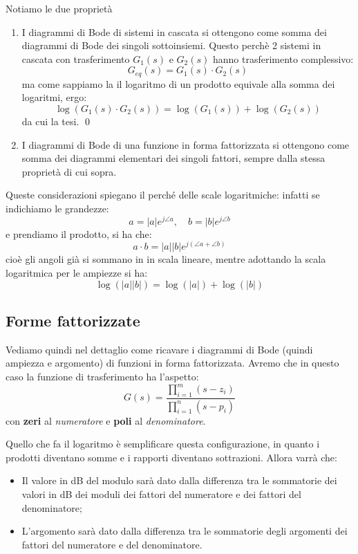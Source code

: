 \documentclass[a4paper,11pt]{article}
\begin{document}
Notiamo le due proprietà
\begin{enumerate}
	\item 
I diagrammi di Bode di sistemi in cascata si ottengono come somma dei diagrammi di Bode dei singoli sottoinsiemi.
Questo perchè 2 sistemi in cascata con trasferimento $G_1(s)$ e $G_2(s)$ hanno trasferimento complessivo:
$$
G_{eq}(s) = G_1(s) \cdot G_2(s)
$$
ma come sappiamo la il logaritmo di un prodotto equivale alla somma dei logaritmi, ergo:
$$
\log \left( G_1(s) \cdot G_2(s) \right) = \log \left( G_1(s) \right) + \log \left( G_2(s) \right)
$$
da cui la tesi. \qed

	\item
I diagrammi di Bode di una funzione in forma fattorizzata si ottengono come somma dei diagrammi elementari dei singoli fattori, sempre dalla stessa proprietà di cui sopra.
\end{enumerate}

Queste considerazioni spiegano il perché delle scale logaritmiche: infatti se indichiamo le grandezze:
$$
a = |a| e^{j \angle a}, \quad b = |b| e^{j \angle b}
$$
e prendiamo il prodotto, si ha che:
$$
a \cdot b = |a| |b| e^{j (\angle a + \angle b)}
$$
cioè gli angoli già si sommano in in scala lineare, mentre adottando la scala logaritmica per le ampiezze si ha:
$$
\log \left( |a||b| \right) = \log \left( |a| \right) + \log \left( |b| \right)
$$

\subsection{Forme fattorizzate}
Vediamo quindi nel dettaglio come ricavare i diagrammi di Bode (quindi ampiezza e argomento) di funzioni in forma fattorizzata.
Avremo che in questo caso la funzione di trasferimento ha l'aspetto:
\begin{equation}
G(s) = \frac{\prod_{i=1}^m(s - z_i)}{\prod_{i=1}^n(s - p_i)}
\end{equation}
con \textbf{zeri} al \textit{numeratore} e \textbf{poli} al \textit{denominatore}.

Quello che fa il logaritmo è semplificare questa configurazione, in quanto i prodotti diventano somme e i rapporti diventano sottrazioni.
Allora varrà che:
\begin{itemize}
	\item Il valore in dB del modulo sarà dato dalla differenza tra le sommatorie dei valori in dB dei moduli dei fattori del numeratore e dei fattori del denominatore;
	\item L'argomento sarà dato dalla differenza tra le sommatorie degli argomenti dei fattori del numeratore e del denominatore.
\end{itemize}
\end{document}
